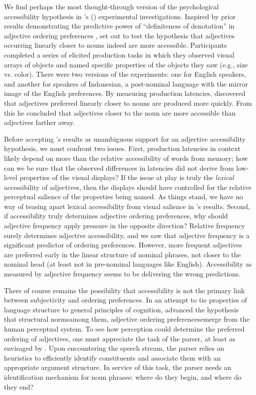 \documentclass{sp}
\begin{document}
We find perhaps the most thought-through version of the psychological accessibility hypothesis in \citeauthor{martin1969competence}'s (\citeyear{martin1969competence}) experimental investigations. Inspired by prior results demonstrating the predictive power of ``definiteness of denotation'' in adjective ordering preferences \citep{martin1969}, \citeauthor{martin1969competence} set out to test the hypothesis that adjectives occurring linearly closer to nouns indeed are more accessible. Participants completed a series of elicited production tasks in which they observed visual arrays of objects and named specific properties of the objects they saw (e.g., size vs. color). There were two versions of the experiments: one for English speakers, and another for speakers of Indonesian, a post-nominal language with the mirror image of the English preferences. By measuring production latencies, \citeauthor{martin1969competence} discovered that adjectives preferred linearly closer to nouns are produced more quickly. From this he concluded that adjectives closer to the noun are more accessible than adjectives farther away. 

Before accepting \citeauthor{martin1969competence}'s results as unambiguous support for an adjective accessibility hypothesis, we must confront two issues. First, production latencies in context likely depend on more than the relative accessibility of words from memory; how can we be sure that the observed differences in latencies did not derive from low-level properties of the visual displays? If the issue at play is truly the \emph{lexical} accessibility of adjectives, then the displays should have controlled for the relative perceptual salience of the properties being named. As things stand, we have no way of teasing apart lexical accessibility from visual salience in \citeauthor{martin1969competence}'s results.  
Second, if accessibility truly determines adjective ordering preferences, why should adjective frequency apply pressure in the opposite direction? Relative frequency surely determines adjective accessibility, and we saw that adjective frequency is a significant predictor of ordering preferences. However, more frequent adjectives are preferred early in the linear structure of nominal phrases, not closer to the nominal head (at least not in pre-nominal languages like English). Accessibility as measured by adjective frequency seems to be delivering the wrong predictions.

There of course remains the possibility that accessibility is not the primary link between subjectivity and ordering preferences. In an attempt to tie properties of language structure to general principles of cognition, \cite{bever1970} advanced the hypothesis that structural norms\dash among them, adjective ordering preferences\dash emerge from the human perceptual system. To see how perception could determine the preferred ordering of adjectives, one must appreciate the task of the parser, at least as envisaged by \citeauthor{bever1970}. Upon encountering the speech stream, the parser relies on heuristics to efficiently identify constituents and associate them with an appropriate argument structure. In service of this task, the parser needs an identification mechanism for noun phrases: where do they begin, and where do they end? 
\end{document}
